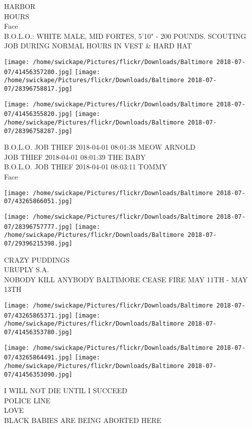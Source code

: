\documentclass[10pt,letterpaper]{article}
\begin{document}
HARBOR\\
HOURS\\
Face\\
B.O.L.O.: WHITE MALE, MID FORTES, 5'10" {-} 200 POUNDS.  SCOUTING JOB DURING NORMAL HOURS IN VEST \& HARD HAT\\
\pagebreak

\texttt{[image: /home/swickape/Pictures/flickr/Downloads/Baltimore 2018-07-07/41456357280.jpg]}
\texttt{[image: /home/swickape/Pictures/flickr/Downloads/Baltimore 2018-07-07/28396758817.jpg]}

\texttt{[image: /home/swickape/Pictures/flickr/Downloads/Baltimore 2018-07-07/41456355820.jpg]}
\texttt{[image: /home/swickape/Pictures/flickr/Downloads/Baltimore 2018-07-07/28396758287.jpg]}

B.O.L.O. JOB THIEF 2018{-}04{-}01 08:01:38 MEOW ARNOLD\\
JOB THIEF 2018{-}04{-}01 08:01:39 THE BABY\\
B.O.L.O. JOB THIEF 2018{-}04{-}01 08:03:11 TOMMY\\
Face\\
\pagebreak

\texttt{[image: /home/swickape/Pictures/flickr/Downloads/Baltimore 2018-07-07/43265866051.jpg]}

\vspace{0.25in}
\texttt{[image: /home/swickape/Pictures/flickr/Downloads/Baltimore 2018-07-07/28396757777.jpg]}
\texttt{[image: /home/swickape/Pictures/flickr/Downloads/Baltimore 2018-07-07/29396215398.jpg]}

CRAZY PUDDINGS\\
URUPLY S.A.\\
NOBODY KILL ANYBODY BALTIMORE CEASE FIRE MAY 11TH {-} MAY 13TH\\
\pagebreak

\texttt{[image: /home/swickape/Pictures/flickr/Downloads/Baltimore 2018-07-07/43265865371.jpg]}
\texttt{[image: /home/swickape/Pictures/flickr/Downloads/Baltimore 2018-07-07/41456353780.jpg]}

\texttt{[image: /home/swickape/Pictures/flickr/Downloads/Baltimore 2018-07-07/43265864491.jpg]}
\texttt{[image: /home/swickape/Pictures/flickr/Downloads/Baltimore 2018-07-07/41456353090.jpg]}

I WILL NOT DIE UNTIL I SUCCEED\\
POLICE LINE\\
LOVE\\
BLACK BABIES ARE BEING ABORTED HERE\\
\pagebreak
\end{document}
